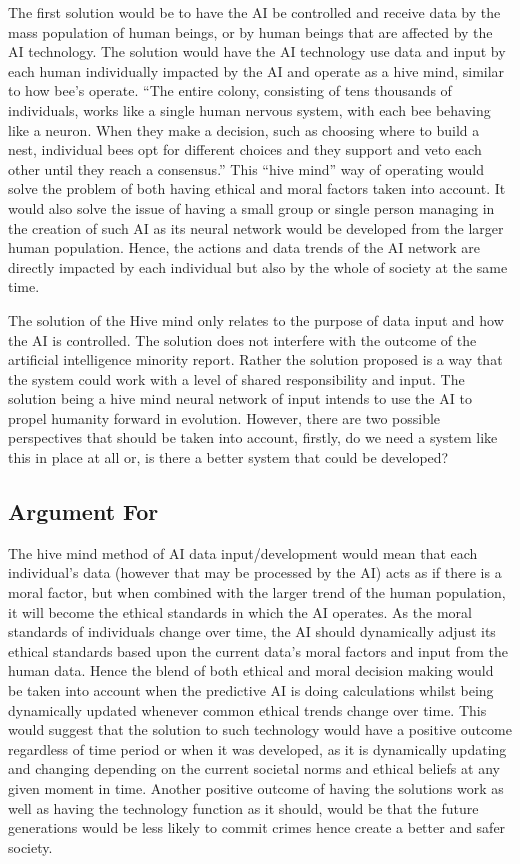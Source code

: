 \documentclass{article}
\begin{document}
The first solution would be to have the AI be controlled and receive data by the mass population of human beings, or by human beings that are affected by the AI technology. The solution would have the AI technology use data and input by each human individually impacted by the AI and operate as a hive mind, similar to how bee’s operate. “The entire colony, consisting of tens thousands of individuals, works like a single human nervous system, with each bee behaving like a neuron. When they make a decision, such as choosing where to build a nest, individual bees opt for different choices and they support and veto each other until they reach a consensus.” \cite{yong_2019} This “hive mind” way of operating would solve the problem of both having ethical and moral factors taken into account. It would also solve the issue of having a small group or single person managing in the creation of such AI as its neural network would be developed from the larger human population. Hence, the actions and data trends of the AI network are directly impacted by each individual but also by the whole of society at the same time.

The solution of the Hive mind only relates to the purpose of data input and how the AI is controlled. The solution does not interfere with the outcome of the artificial intelligence minority report. Rather the solution proposed is a way that the system could work with a level of shared responsibility and input. The solution being a hive mind neural network of input intends to use the AI to propel humanity forward in evolution.  However, there are two possible perspectives that should be taken into account, firstly, do we need a system like this in place at all or, is there a better system that could be developed?

\subsection{Argument For}
The hive mind method of AI data input/development would mean that each individual’s data (however that may be processed by the AI) acts as if there is a moral factor, but when combined with the larger trend of the human population, it will become the ethical standards in which the AI operates. As the moral standards of individuals change over time, the AI should dynamically adjust its ethical standards based upon the current data’s moral factors and input from the human data. Hence the blend of both ethical and moral decision making would be taken into account when the predictive AI is doing calculations whilst being dynamically updated whenever common ethical trends change over time. This would suggest that the solution to such technology would have a positive outcome regardless of time period or when it was developed, as it is dynamically updating and changing depending on the current societal norms and ethical beliefs at any given moment in time. Another positive outcome of having the solutions work as well as having the technology function as it should, would be that the future generations would be less likely to commit crimes hence create a better and safer society. 
\end{document}
